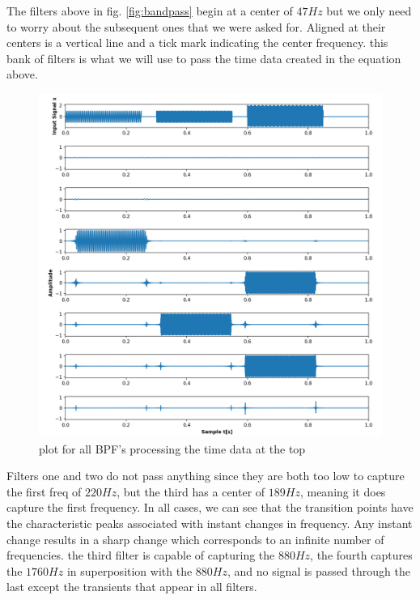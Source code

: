 \documentclass[a4paper, 11pt]{exam}
\begin{document}
\newline
The filters above in fig. \ref{fig:bandpass} begin at a center of $47Hz$ but we only need to worry about the subsequent ones that we were asked for. Aligned at their centers is a vertical line and a tick mark indicating the center frequency. this bank of filters is what we will use to pass the time data created in the equation above. 
\begin{figure}[h!]
  \centering
  \hspace*{-1.5cm}\includegraphics[width=17cm]{../images/post_lock_time_data.png}
  \caption{plot for all BPF's processing the time data at the top}
  \label{fig:time_data}
\end{figure}
Filters one and two do not pass anything since they are both too low to capture the first freq of $220Hz$, but the third has a center of $189Hz$, meaning it does capture the first frequency. In all cases, we can see that the transition points have the characteristic peaks associated with instant changes in frequency. Any instant change results in a sharp change which corresponds to an infinite number of frequencies. the third filter is capable of capturing the $880Hz$, the fourth captures the $1760Hz$ in superposition with the $880Hz$, and no signal is passed through the last except the transients that appear in all filters.
\newpage
\end{document}
